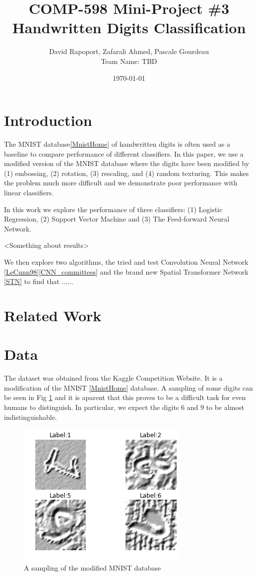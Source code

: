 \documentclass[conference]{IEEEtran}
\author{David Rapoport, Zafarali Ahmed, Pascale Gourdeau\\Team Name: TBD}
\title{COMP-598 Mini-Project \#3\\Handwritten Digits Classification}
\date{\today}
\begin{document}
\maketitle

\section{Introduction}
The MNIST database\ref{MnistHome} of handwritten digits is often used as a baseline to compare performance of different classifiers. In this paper, we use a modified version of the MNIST database where the digits have been modified by (1) embossing, (2) rotation, (3) rescaling, and (4) random texturing. This makes the problem much more difficult and we demonstrate poor performance with linear classifiers.

In this work we explore the performance of three classifiers: (1) Logistic Regression, (2) Support Vector Machine and (3) The Feed-forward Neural Network. 

<Something about results>

We then explore two algorithms, the tried and test Convolution Neural Network \ref{LeCunn98}\ref{CNN_committees} and the brand new Spatial Transformer Network \ref{STN} to find that ......


\section{Related Work}




\section{Data}
The dataset was obtained from the Kaggle Competition Website. It is a modification of the MNIST \ref{MnistHome} database. A sampling of some digits can be seen in Fig \ref{MNISTSample} and it is aparent that this proves to be a difficult task for even humans to distinguish. In particular, we expect the digits $6$ and $9$ to be almost indistinguishable.

\begin{figure}[h]
	\centering
	\includegraphics[scale=0.40]{sample_of_images.png}
	\caption{A sampling of the modified MNIST database}
	\label{MNISTSample}
\end{figure}
\end{document}

